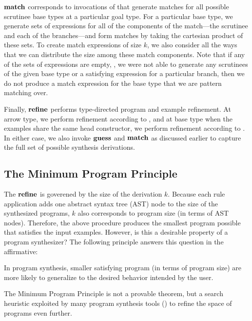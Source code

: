 $\mathbf{match}$ corresponds to invocations of  that generate matches for all possible scrutinee base types at a particular goal type.
For a particular base type, we generate sets of expressions for all of the components of the match---the scrutinee and each of the branches---and form matches by taking the cartesian product of these sets.
To create match expressions of size $k$, we also consider all the ways that we can distribute the size among these match components.
Note that if any of the sets of expressions are empty, \eg, we were not able to generate any scrutinees of the given base type or a satisfying expression for a particular branch, then we do not produce a match expression for the base type that we are pattern matching over.

Finally, $\mathbf{refine}$ performs type-directed program and example refinement.
At arrow type, we perform refinement according to , and at base type when the examples share the same head constructor, we perform refinement according to .
In either case, we also invoke $\mathbf{guess}$ and $\mathbf{match}$ as discussed earlier to capture the full set of possible synthesis derivations.

\subsection{The Minimum Program Principle}
\label{subsec:the-minimum-program-principle}

The $\mathbf{refine}$ is goverened by the size of the derivation $k$.
Because each rule application adds one abstract syntax tree (AST) node to the size of the synthesized programs, $k$ also corresponds to program size (in terms of AST nodes).
Therefore, the above procedure produces the smallest program possible that satisfies the input examples.
However, is this a desirable property of a program synthesizer?
The following principle answers this question in the affirmative:
\begin{definition}
  In program synthesis, smaller satisfying program (in terms of program size) are more likely to generalize to the desired behavior intended by the user.
\end{definition}
The Minimum Program Principle is not a provable theorem, but a search heuristic exploited by many program synthesis tools () to refine the space of programs even further.

